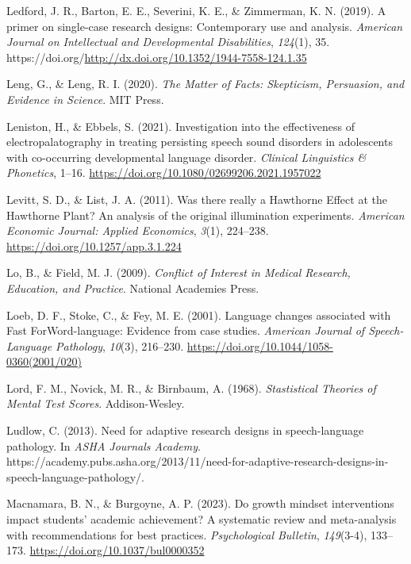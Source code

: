 \documentclass{krantz}
\newlength{\cslhangindent}
\newlength{\cslentryspacingunit} %
\newenvironment{CSLReferences}[2] %
{%
\setlength{\parindent}{0pt}
\ifodd #1
\let\oldpar\par
\def\par{\hangindent=\cslhangindent\oldpar}
\fi
\setlength{\parskip}{#2\cslentryspacingunit}
}%
{}
\begin{document}
\begin{CSLReferences}{1}{0}
\leavevmode{}%
Ledford, J. R., Barton, E. E., Severini, K. E., \& Zimmerman, K. N. (2019). A primer on single-case research designs: {Contemporary} use and analysis. \emph{American Journal on Intellectual and Developmental Disabilities}, \emph{124}(1), 35. https://doi.org/\url{http://dx.doi.org/10.1352/1944-7558-124.1.35}

\leavevmode{}%
Leng, G., \& Leng, R. I. (2020). \emph{The {Matter} of {Facts}: {Skepticism}, {Persuasion}, and {Evidence} in {Science}}. {MIT Press}.

\leavevmode{}%
Leniston, H., \& Ebbels, S. (2021). Investigation into the effectiveness of electropalatography in treating persisting speech sound disorders in adolescents with co-occurring developmental language disorder. \emph{Clinical Linguistics \& Phonetics}, 1--16. \url{https://doi.org/10.1080/02699206.2021.1957022}

\leavevmode{}%
Levitt, S. D., \& List, J. A. (2011). Was there really a {Hawthorne Effect} at the {Hawthorne Plant}? {An} analysis of the original illumination experiments. \emph{American Economic Journal: Applied Economics}, \emph{3}(1), 224--238. \url{https://doi.org/10.1257/app.3.1.224}

\leavevmode{}%
Lo, B., \& Field, M. J. (2009). \emph{Conflict of {Interest} in {Medical Research}, {Education}, and {Practice}}. {National Academies Press}.

\leavevmode{}%
Loeb, D. F., Stoke, C., \& Fey, M. E. (2001). Language changes associated with {Fast ForWord-language}: {Evidence} from case studies. \emph{American Journal of Speech-Language Pathology}, \emph{10}(3), 216--230. \url{https://doi.org/10.1044/1058-0360(2001/020)}

\leavevmode{}%
Lord, F. M., Novick, M. R., \& Birnbaum, A. (1968). \emph{Stastistical {Theories} of {Mental Test Scores}}. {Addison-Wesley}.

\leavevmode{}%
Ludlow, C. (2013). Need for adaptive research designs in speech-language pathology. In \emph{ASHA Journals Academy}. https://academy.pubs.asha.org/2013/11/need-for-adaptive-research-designs-in-speech-language-pathology/.

\leavevmode{}%
Macnamara, B. N., \& Burgoyne, A. P. (2023). Do growth mindset interventions impact students' academic achievement? {A} systematic review and meta-analysis with recommendations for best practices. \emph{Psychological Bulletin}, \emph{149}(3-4), 133--173. \url{https://doi.org/10.1037/bul0000352}


\end{CSLReferences}
\end{document}
